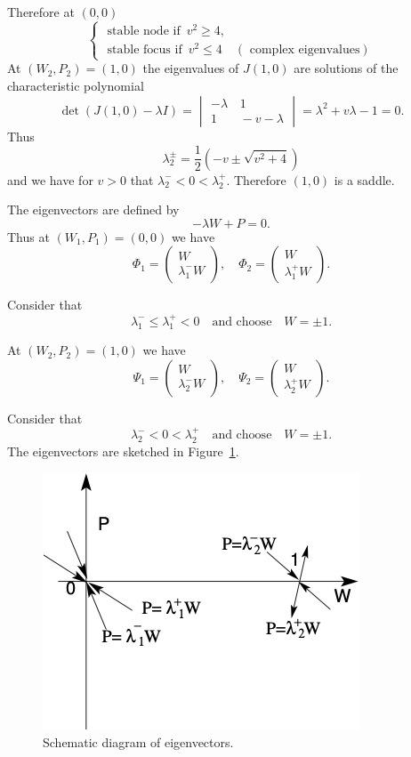 \documentclass[
  letterpaper,
  DIV=11,
  numbers=noendperiod]{scrreprt}
\theoremstyle{definition}
\theoremstyle{plain}
\theoremstyle{plain}
\theoremstyle{remark}
\begin{document}
Therefore at \((0, 0)\) \[
\begin{cases} 
\text{ stable node if }\,   v^2 \geq 4, \\
\text{ stable focus if } \,  v^2 \leq 4 \quad (\text{ complex eigenvalues})
\end{cases}
\] At \((W_2, P_2)=(1,0)\) the eigenvalues of \(J(1,0)\) are solutions
of the characteristic polynomial \[
\det(J(1,0) - \lambda I) = \begin{vmatrix} -\lambda & \, 1 \\
1 & \, -v - \lambda
\end{vmatrix} = \lambda^2 + v \lambda - 1 = 0.
\] Thus \[
\lambda^{\pm}_2 = \frac 12 ( - v \pm \sqrt{ v^2 + 4})
\] and we have for \(v>0\) that \(\lambda_2^{-} <0 < \lambda_2^+\).
Therefore \((1,0)\) is a saddle.

The eigenvectors are defined by \[
- \lambda W + P = 0.
\] Thus at \((W_1, P_1)=(0,0)\) we have \[
\Phi_1 = \begin{pmatrix}
W\\
\lambda_1^- W
\end{pmatrix}, \quad  \Phi_2 = \begin{pmatrix}
W\\
\lambda_1^+ W
\end{pmatrix}. 
\]

Consider that \[
\lambda_1^- \leq \lambda_1^+ <0 \quad \textrm{and choose} \quad W = \pm 1.
\]

At \((W_2, P_2)=(1,0)\) we have \[
\Psi_1 = \begin{pmatrix}
W\\
\lambda_2^- W
\end{pmatrix}, \quad  \Psi_2 = \begin{pmatrix}
W\\
\lambda_2^+ W
\end{pmatrix}.
\]

Consider that \[
\lambda_2^- <0 < \lambda_2^+  \quad \textrm{and choose} \quad W = \pm 1.
\] The eigenvectors are sketched in Figure~\ref{fig-eigenvectors}.

\begin{figure}

{\centering \includegraphics{fig_4.png}

}

\caption{\label{fig-eigenvectors}Schematic diagram of eigenvectors.}

\end{figure}
\end{document}
